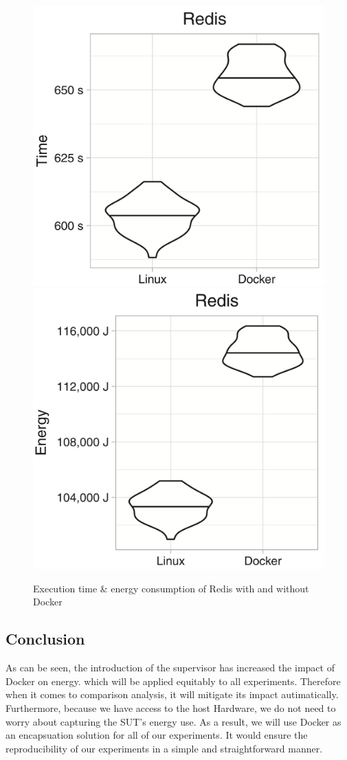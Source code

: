 \begin{figure}[!bht]
    \includegraphics[width=.5\linewidth]{imgs/docker_vs_vm_energy_paper/reddis_time}
    \includegraphics[width=.5\linewidth]{imgs/docker_vs_vm_energy_paper/reddis_energy}
    \caption{Execution time \& energy consumption of Redis with and without Docker~\cite{santos2018does}}\label{fig:docker_reddis}
\end{figure}


\subsection{Conclusion}
As can be seen, the introduction of the supervisor has increased the impact of Docker on energy.
which will be applied equitably to all experiments.
Therefore when it comes to comparison analysis, it will mitigate its impact autimatically.
Furthermore, because we have access to the host Hardware, we do not need to worry about capturing the SUT's energy use.
As a result, we will use Docker as an encapsuation solution for all of our experiments.
It would ensure the reproducibility of our experiments in a simple and straightforward manner.
\clearpage